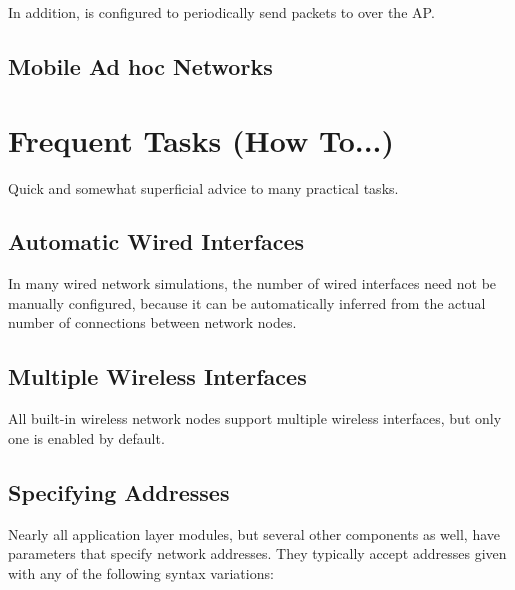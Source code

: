 In addition,  is configured to periodically send 
 packets to  over the AP.




\subsection{Mobile Ad hoc Networks}




\section{Frequent Tasks (How To...)}

Quick and somewhat superficial advice to many practical tasks.

\subsection{Automatic Wired Interfaces}

In many wired network simulations, the number of wired interfaces need not
be manually configured, because it can be automatically inferred from the
actual number of connections between network nodes.


\subsection{Multiple Wireless Interfaces}

All built-in wireless network nodes support multiple wireless interfaces,
but only one is enabled by default.


\subsection{Specifying Addresses}

Nearly all application layer modules, but several other components as well,
have parameters that specify network addresses. They typically accept
addresses given with any of the following syntax variations:

